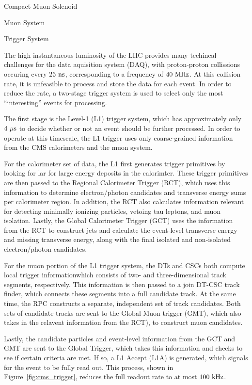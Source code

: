 \begin{section}{Compact Muon Solenoid}
\begin{subsection}{Muon System}
\end{subsection}

\begin{subsection}{Trigger System}

The high instantaneous luminosity of the LHC provides many techincal challenges for the data aquisition system (DAQ), with proton-proton collissions occuring every $25~\mathrm{ns}$, corresponding to a frequency of $40~\mathrm{MHz}$. 
At this collision rate, it is unfeasible to process and store the data for each event.
In order to reduce the rate, a two-stage trigger system is used to select only the most ``interesting'' events for processing.

The first stage is the Level-1 (L1) trigger system, which has approximately only $4~\mu\mathrm{s}$ to decide whether or not an event should be further processed. 
In order to operate at this timescale, the L1 trigger uses only coarse-grained information from the CMS calorimeters and the muon system.

For the calorimeter set of data, the L1 first generates trigger primitives by looking for lar for large energy deposits in the calorimter.
These trigger primitives are then passed to the Regional Calorimeter Trigger (RCT), which uses this information to determine electron/photon candidates and transverse energy sums per calorimeter region.
In addition, the RCT also calculates information relevant for detecting minimally ionizing particles, vetoing tau leptons, and muon isolation.
Lastly, the Global Calorimeter Trigger (GCT) uses the information from the RCT to construct jets and calculate the event-level transverse energy and missing transverse energy, along with the final isolated and non-isolated electron/photon candidates.

For the muon portion of the L1 trigger system, the DTs and CSCs both compute local trigger informationwhich consists of two- and three-dimensional track segments, respectively.
This information is then passed to a join DT-CSC track finder, which connects these segments into a full candidate track.
At the same time, the RPC constructs a separate, independent set of track candidates.
Both sets of candidate tracks are sent to the Global Muon trigger (GMT), which also takes in the relavent information from the RCT), to construct muon candidates.

Lastly, the candidate particles and event-level information from the GCT and GMT are sent to the Global Trigger, which takes this information and checks to see if certain criteria are met.
If so, a L1 Accept (L1A) is generated, which signals for the event to be fully read out.
This process, shown in Figure~\ref{fig:cms_trigger}, reduces the full readout rate to at most $100~\mathrm{kHz}$.


\end{subsection}
\end{section}
